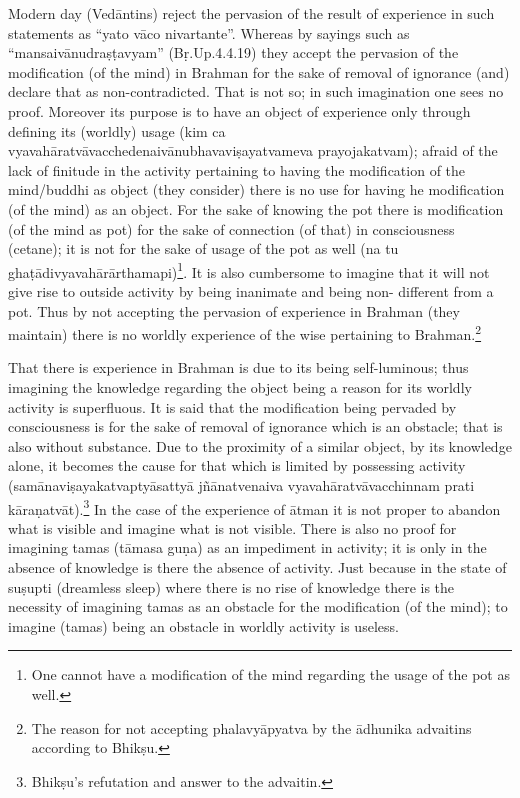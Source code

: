 Modern day (Vedāntins) reject the pervasion of the result of experience in such statements as “yato vāco nivartante”. Whereas by sayings such as “mansaivānudraṣṭavyam” (Bṛ.Up.4.4.19) they accept the pervasion of the modification (of the mind) in Brahman for the sake of removal of ignorance (and) declare that as non-contradicted. That is not so; in such imagination one sees no proof. Moreover its purpose is to have an object of experience only through defining its (worldly) usage (kim ca vyavahāratvāvacchedenaivānubhavaviṣayatvameva prayojakatvam); afraid of the lack of finitude in the activity pertaining to having the modification of the mind/buddhi as object (they consider) there is no use for having he   modification (of the mind) as an object. For the sake of knowing the pot there is modification (of the mind as pot) for the sake of connection (of that) in consciousness (cetane); it is not for the sake of usage of the pot as well (na tu ghaṭādivyavahārārtha\-mapi)\footnote{One cannot have a modification of the mind regarding the usage of the pot as well.}. It is also cumbersome to imagine that it will not give rise to outside activity by being inanimate and being non- different from a pot. Thus by not accepting the pervasion of experience in Brahman (they maintain) there is no worldly experience of the wise pertaining to Brahman.\footnote{The reason for not accepting phalavyāpyatva by the ādhunika advaitins according to Bhikṣu.} 

That there is experience in Brahman is due to its being self-luminous; thus imagining the knowledge regarding the object being a reason for its worldly activity is superfluous. It is said that the modification being pervaded by consciousness   is for the sake of removal of ignorance which is an obstacle; that is also without substance. Due to the proximity of a similar object, by its knowledge alone, it becomes the cause for that which is limited by possessing activity (samānaviṣayakatvaptyāsattyā jñānatvenaiva vyavahāratvāvacchinnam prati kāraṇatvāt).\footnote{Bhikṣu’s refutation and answer to the advaitin.} In the case of the experience of ātman it is not proper to abandon what is visible and imagine what is not visible. There is also no proof for imagining tamas (tāmasa guṇa) as an impediment in activity; it is only in the absence of knowledge is there the absence of activity. Just because in the state of suṣupti (dreamless sleep) where there is no rise of knowledge there is the necessity of imagining tamas as an obstacle for the modification (of the mind); to imagine (tamas) being an obstacle in worldly activity is useless.

